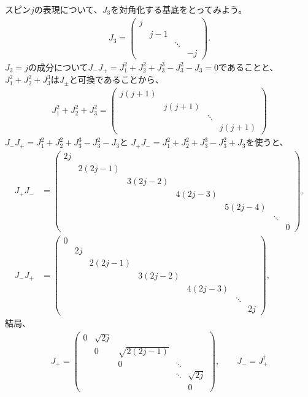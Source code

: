 \documentclass[10pt,a4paper]{jarticle}
\begin{document}
スピン$j$の表現について、$J_3$を対角化する基底をとってみよう。
\begin{align}
J_3 = \left(\begin{array}{cccc}
j &&& \\
& j-1 && \\
&& \ddots & \\
&&& -j
\end{array}\right).
\end{align}
%
$J_3 = j$の成分について$J_- J_+ = J_1^2 + J_2^2 + J_3^3 - J_3^2 - J_3 = 0$であることと、
$J_1^2 + J_2^2 + J_3^3$は$J_\pm$と可換であることから、
\begin{align}
J_1^2+J_2^2+J_3^2 = \left(\begin{array}{cccc}
j(j+1) &&& \\
& j(j+1) && \\
&& \ddots & \\
&&& j(j+1)
\end{array}\right)
\end{align}
%
$J_- J_+ = J_1^2 + J_2^2 + J_3^3 - J_3^2 - J_3$と
$J_+ J_- = J_1^2 + J_2^2 + J_3^3 - J_3^2 + J_3$を使うと、
\begin{align}
J_+ J_-
& = \left(\begin{array}{ccccccc}
 2j &&&&&& \\
& 2(2j-1) &&&&& \\
&& 3(2j-2) &&&& \\
&&& 4(2j-3) &&& \\
&&&& 5(2j-4) && \\
&&&&& \ddots & \\
&&&&&& 0
\end{array}\right), \\
%
J_- J_+
& = \left(\begin{array}{ccccccc}
0 &&&&&& \\
& 2j &&&&& \\
&& 2(2j-1) &&&& \\
&&& 3(2j-2) &&& \\
&&&& 4(2j-3) && \\
&&&&& \ddots & \\
&&&&&& 2j
\end{array}\right), \quad
\end{align}
%
結局、
\begin{align}
J_+ = \left(\begin{array}{ccccc}
0& \sqrt{2j} &&& \\
&0& \sqrt{2(2j-1)} && \\
&&0& \ddots & \\
&&&\ddots& \sqrt{2j} \\
&&&&0
\end{array}\right), \qquad
J_- = J_+^\dagger
\end{align}
\end{document}
